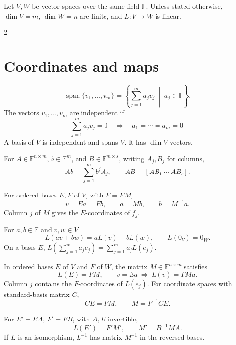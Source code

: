 \begin{fullwidth}
  Let \(V,W\) be vector spaces over the same field \(\mathbb F\).
  Unless stated otherwise, \(\dim V=m\), \(\dim W=n\) are finite,
  and \(L:V\to W\) is linear.

  \begin{multicols}{2}
    \raggedcolumns
    \section{Coordinates and maps}
    \label{sec:appendix:formula-sheet-coordinates-and-maps}

    \[
      \operatorname{span}\{v_1,\ldots,v_m\}
      =\left\{\sum_{j=1}^m a_jv_j\;\middle|\;a_j\in\mathbb F\right\}.
    \]
    The vectors \(v_1,\ldots,v_m\) are independent if
    \[
      \sum_{j=1}^m a_jv_j=0
      \quad\Longrightarrow\quad a_1=\cdots=a_m=0.
    \]
    A basis of \(V\) is independent and spans \(V\). It has \(\dim V\) vectors.

    For \(A\in\mathbb F^{n\times m}\), \(b\in\mathbb F^m\), and
    \(B\in\mathbb F^{m\times s}\), writing \(A_j,B_j\) for columns,
    \[
      Ab=\sum_{j=1}^m b^jA_j,\qquad AB=[AB_1\ \cdots\ AB_s].
    \]

    For ordered bases \(E,F\) of \(V\), with \(F=EM\),
    \[
      v=Ea=Fb,\qquad a=Mb,\qquad b=M^{-1}a.
    \]
    Column \(j\) of \(M\) gives the \(E\)-coordinates of \(f_j\).

    For \(a,b\in\mathbb F\) and \(v,w\in V\),
    \[
      L(av+bw)=aL(v)+bL(w),\qquad L(0_V)=0_W.
    \]
    On a basis \(E\),
    \(L(\sum_{j=1}^m a_je_j)=\sum_{j=1}^m a_jL(e_j)\).

    In ordered bases \(E\) of \(V\) and \(F\) of \(W\), the matrix
    \(M\in\mathbb F^{n\times m}\) satisfies
    \[
      L(E)=FM,\qquad v=Ea\ \Longrightarrow\ L(v)=FMa.
    \]
    Column \(j\) contains the \(F\)-coordinates of \(L(e_j)\).
    For coordinate spaces with standard-basis matrix \(C\),
    \[
      CE=FM,\qquad M=F^{-1}CE.
    \]

    For \(E'=EA\), \(F'=FB\), with \(A,B\) invertible,
    \[
      L(E')=F'M',\qquad M'=B^{-1}MA.
    \]
    If \(L\) is an isomorphism, \(L^{-1}\) has matrix \(M^{-1}\)
    in the reversed bases.


\end{multicols}
\end{fullwidth}
